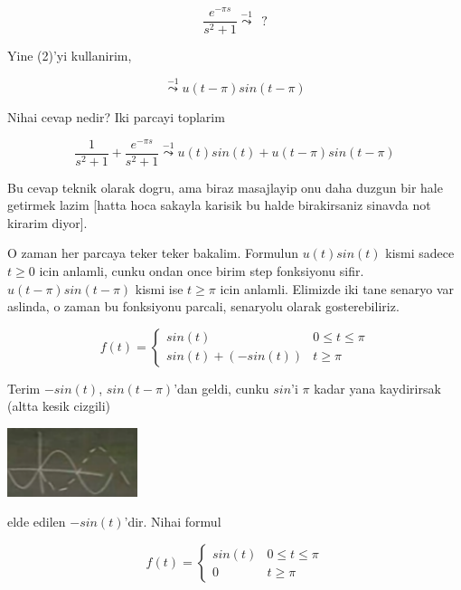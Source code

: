 \documentclass[12pt,fleqn]{article}\usepackage{../common}
\begin{document}
\[ \frac{e^{-\pi s}}{s^2 + 1} \stackrel{-1}{\leadsto} \ \ ? \]

Yine (2)'yi kullanirim, 

\[\stackrel{-1}{\leadsto} u(t-\pi)sin(t-\pi) \]

Nihai cevap nedir? Iki parcayi toplarim

\[ \frac{1}{s^2+1} + \frac{e^{-\pi s}}{s^2 + 1} \stackrel{-1}{\leadsto} 
u(t)sin(t) + u(t-\pi)sin(t-\pi) 
\]

Bu cevap teknik olarak dogru, ama biraz masajlayip onu daha duzgun bir hale
getirmek lazim [hatta hoca sakayla karisik bu halde birakirsaniz sinavda
not kirarim diyor]. 

O zaman her parcaya teker teker bakalim. Formulun $u(t)sin(t)$ kismi
sadece $t \ge 0$ icin anlamli, cunku ondan once birim step fonksiyonu
sifir. $u(t-\pi)sin(t-\pi) $ kismi ise $t \ge \pi$ icin anlamli. Elimizde
iki tane senaryo var aslinda, o zaman bu fonksiyonu parcali, senaryolu
olarak gosterebiliriz. 

\[ 
f(t) = 
\left\{ \begin{array}{ll}
sin(t) & 0 \le t \le \pi \\
sin(t) + (-sin(t)) & t \ge \pi
\end{array} \right.
 \]

Terim $-sin(t)$, $sin(t-\pi)$'dan geldi, cunku $sin$'i $\pi$ kadar yana
kaydirirsak (altta kesik cizgili) 

\includegraphics[height=2cm]{22_10.png}

elde edilen $-sin(t)$'dir. Nihai formul

\[ 
f(t) = 
\left\{ \begin{array}{ll}
sin(t) & 0 \le t \le \pi \\
0 & t \ge \pi
\end{array} \right.
 \]
\end{document}
